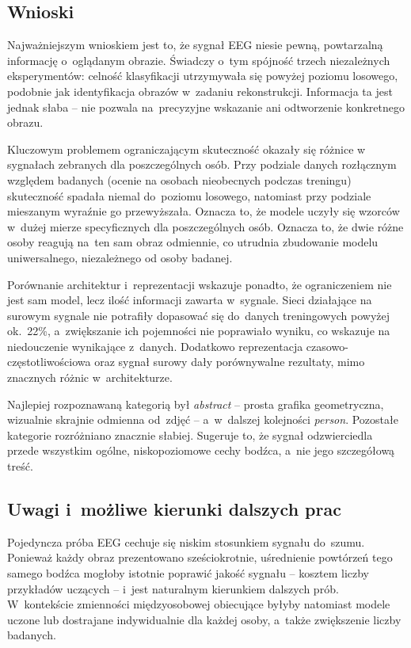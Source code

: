 \documentclass[12pt,a4paper,numbers=enddot,headings=small]{scrartcl} %
\begin{document}
	\subsection{Wnioski}
	
	Najważniejszym wnioskiem jest to, że sygnał EEG niesie pewną, powtarzalną
	informację o~oglądanym obrazie. Świadczy o~tym spójność trzech niezależnych
	eksperymentów: celność klasyfikacji utrzymywała się powyżej poziomu losowego,
	podobnie jak identyfikacja obrazów w~zadaniu rekonstrukcji. Informacja ta jest
	jednak słaba -- nie pozwala na~precyzyjne wskazanie ani odtworzenie konkretnego
	obrazu.
	
	Kluczowym problemem ograniczającym skuteczność okazały się różnice w sygnałach zebranych dla poszczególnych
	osób. Przy podziale danych rozłącznym względem badanych (ocenie na
	osobach nieobecnych podczas treningu) skuteczność spadała niemal do~poziomu
	losowego, natomiast przy podziale mieszanym wyraźnie go przewyższała. Oznacza
	to, że modele uczyły się wzorców w~dużej mierze specyficznych dla
	poszczególnych osób. Oznacza to, że dwie różne osoby reagują na~ten sam obraz odmiennie, co
	utrudnia zbudowanie modelu uniwersalnego, niezależnego od osoby badanej.
	
	Porównanie architektur i~reprezentacji wskazuje ponadto, że ograniczeniem nie
	jest sam model, lecz ilość informacji zawarta w~sygnale. Sieci działające na
	surowym sygnale nie potrafiły dopasować się do~danych treningowych powyżej
	ok.~22\%, a~zwiększanie ich pojemności nie poprawiało wyniku, co wskazuje na
	niedouczenie wynikające z~danych. Dodatkowo reprezentacja
	czasowo-częstotliwościowa oraz sygnał surowy dały porównywalne rezultaty, mimo
	znacznych różnic w~architekturze.
	
	Najlepiej rozpoznawaną kategorią był \textit{abstract} -- prosta grafika
	geometryczna, wizualnie skrajnie odmienna od~zdjęć -- a~w~dalszej kolejności
	\textit{person}. Pozostałe kategorie rozróżniano znacznie słabiej. Sugeruje to,
	że sygnał odzwierciedla przede wszystkim ogólne, niskopoziomowe cechy bodźca,
	a~nie jego szczegółową treść.
	
	\subsection{Uwagi i~możliwe kierunki dalszych prac}
	
	Pojedyncza próba EEG cechuje się niskim stosunkiem sygnału do~szumu. Ponieważ
	każdy obraz prezentowano sześciokrotnie, uśrednienie powtórzeń tego samego
	bodźca mogłoby istotnie poprawić jakość sygnału -- kosztem liczby przykładów
	uczących -- i~jest naturalnym kierunkiem dalszych prób. W~kontekście zmienności
	międzyosobowej obiecujące byłyby natomiast modele uczone lub dostrajane
	indywidualnie dla każdej osoby, a~także zwiększenie liczby badanych.
	
\end{document}
